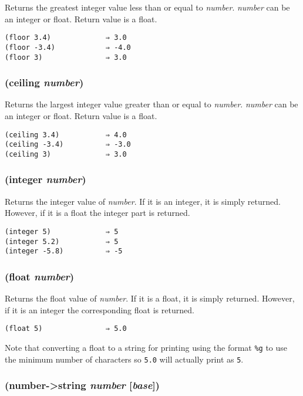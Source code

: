 \documentclass{article}
\begin{document}
Returns the greatest integer value less than or equal to \emph{number}. \emph{number} can
be an integer or float. Return value is a float.

\begin{verbatim}
(floor 3.4)             ⇒ 3.0
(floor -3.4)            ⇒ -4.0
(floor 3)               ⇒ 3.0
\end{verbatim}

\subsubsection{(ceiling \emph{number})}

Returns the largest integer value greater than or equal to \emph{number}. \emph{number}
can be an integer or float. Return value is a float.

\begin{verbatim}
(ceiling 3.4)           ⇒ 4.0
(ceiling -3.4)          ⇒ -3.0
(ceiling 3)             ⇒ 3.0
\end{verbatim}

\subsubsection{(integer \emph{number})}

Returns the integer value of \emph{number}. If it is an integer, it is simply returned.
However, if it is a float the integer part is returned.

\begin{verbatim}
(integer 5)             ⇒ 5
(integer 5.2)           ⇒ 5
(integer -5.8)          ⇒ -5
\end{verbatim}

\subsubsection{(float \emph{number})}

Returns the float value of \emph{number}. If it is a float, it is simply returned.
However, if it is an integer the corresponding float is returned.

\begin{verbatim}
(float 5)               ⇒ 5.0
\end{verbatim}

Note that converting a float to a string for printing using the format \texttt{\%g} to use the
minimum number of characters so \texttt{5.0} will actually print as \texttt{5}.

\subsubsection{(number-\textgreater{}string \emph{number} [\emph{base}])}
\end{document}
